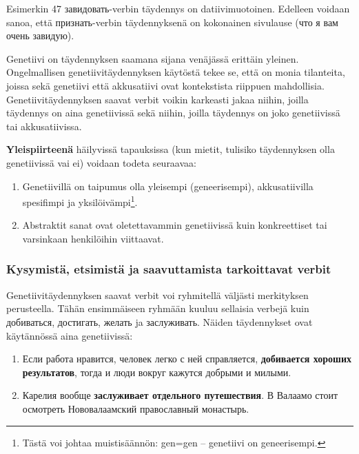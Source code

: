 \documentclass[]{scrartcl}
\providecommand{\tightlist}{%
  \setlength{\itemsep}{0pt}\setlength{\parskip}{0pt}}
\begin{document}
Esimerkin 47 завидовать-verbin täydennys on datiivimuotoinen. Edelleen
voidaan sanoa, että признать-verbin täydennyksenä on kokonainen
sivulause (что я вам очень завидую).

Genetiivi on täydennyksen saamana sijana venäjässä erittäin yleinen.
Ongelmallisen genetiivitäydennyksen käytöstä tekee se, että on monia
tilanteita, joissa sekä genetiivi että akkusatiivi ovat kontekstista
riippuen mahdollisia. Genetiivitäydennyksen saavat verbit voikin
karkeasti jakaa niihin, joilla täydennys on aina genetiivissä sekä
niihin, joilla täydennys on joko genetiivissä tai akkusatiivissa.

\textbf{Yleispiirteenä} häilyvissä tapauksissa (kun mietit, tulisiko
täydennyksen olla genetiivissä vai ei) voidaan todeta seuraavaa:

\begin{enumerate}
\def\labelenumi{\arabic{enumi}.}
\tightlist
\item
  Genetiivillä on taipumus olla yleisempi (geneerisempi), akkusatiivilla
  spesifimpi ja yksilöivämpi\footnote{Tästä voi johtaa muistisäännön:
    gen=gen -- genetiivi on geneerisempi.}.
\item
  Abstraktit sanat ovat oletettavammin genetiivissä kuin konkreettiset
  tai varsinkaan henkilöihin viittaavat.
\end{enumerate}

\subsubsection{Kysymistä, etsimistä ja saavuttamista tarkoittavat
verbit}\label{kysymistuxe4-etsimistuxe4-ja-saavuttamista-tarkoittavat-verbit}

Genetiivitäydennyksen saavat verbit voi ryhmitellä väljästi merkityksen
perusteella. Tähän ensimmäiseen ryhmään kuuluu sellaisia verbejä kuin
добиваться, достигать, желать ja заслуживать. Näiden täydennykset ovat
käytännössä aina genetiivissä:

\begin{enumerate}
\def\labelenumi{(\arabic{enumi})}
\setcounter{enumi}{47}
\item
  Если работа нравится, человек легко с ней справляется,
  \textbf{добивается хороших результатов}, тогда и люди вокруг кажутся
  добрыми и милыми.
\item
  Карелия вообще \textbf{заслуживает отдельного путешествия}. В Валаамо
  стоит осмотреть Нововалаамский православный монастырь.
\end{enumerate}
\end{document}
